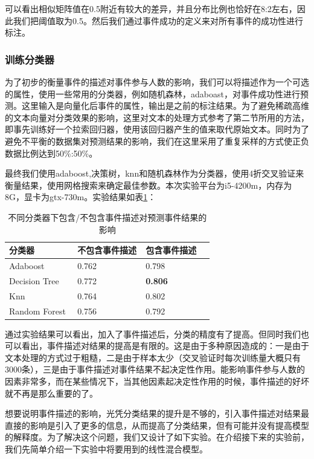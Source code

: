 可以看出相似矩阵值在0.5附近有较大的差异，并且分布比例也恰好在8:2左右，因此我们把阈值取为0.5。然后我们通过事件成功的定义来对所有事件的成功性进行标注。

\subsubsection{训练分类器}
为了初步的衡量事件的描述对事件参与人数的影响，我们可以将描述作为一个可选的属性，使用一些常用的分类器，例如随机森林，adaboast，对事件成功性进行预测。这里输入是向量化后事件的属性，输出是之前的标注结果。为了避免稀疏高维的文本向量对分类效果的影响，这里对文本的处理方式参考了第二节所用的方法，即事先训练好一个拉索回归器，使用该回归器产生的值来取代原始文本。同时为了避免不平衡的数据集对预测结果的影响，我们在这里采用了重复采样的方式使正负数据比例达到50\%:50\%。

最终我们使用adaboost,决策树，knn和随机森林作为分类器，使用4折交叉验证来衡量结果，使用网格搜索来确定最佳参数。本次实验平台为i5-4200m，内存为8G，显卡为gtx-730m。实验结果如表\ref{t1-3}：

\begin{table}[htb] 
  \centering
  \caption{\label{t1-3}不同分类器下包含/不包含事件描述对预测事件结果的影响}
  \begin{tabular*}{\linewidth}{p{0.33\linewidth}p{0.33\linewidth}p{0.33\linewidth}}
\toprule 
分类器&不包含事件描述&包含事件描述\\
\midrule
Adaboost & 0.762 & 0.798 \\
Decision Tree& 0.772 & \textbf{0.806} \\
Knn & 0.764 & 0.802  \\
Random Forest & 0.756 & 0.792 \\
\bottomrule
  \end{tabular*}
\end{table}

通过实验结果可以看出，加入了事件描述后，分类的精度有了提高。但同时我们也可以看出，事件描述对结果的提高是有限的。这是由于多种原因造成的：一是由于文本处理的方式过于粗糙，二是由于样本太少（交叉验证时每次训练量大概只有3000条），三是由于事件描述对事件结果不起决定性作用。能影响事件参与人数的因素非常多，而在某些情况下，当其他因素起决定性作用的时候，事件描述的好坏就不再是那么重要的了。

想要说明事件描述的影响，光凭分类结果的提升是不够的，引入事件描述对结果最直接的影响是引入了更多的信息，从而提高了分类结果，但有可能并没有提高模型的解释度。为了解决这个问题，我们又设计了如下实验。在介绍接下来的实验前，我们先简单介绍一下实验中将要用到的线性混合模型。

